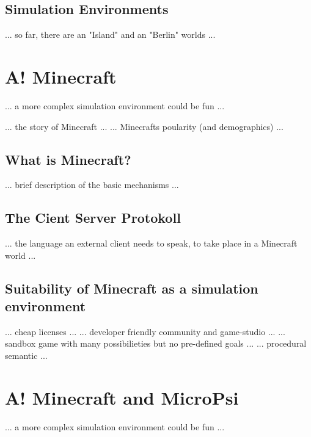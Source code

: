 \subsection{Simulation Environments}
... so far, there are an "Island" and an "Berlin" worlds ...

\section{A! Minecraft}
... a more complex simulation environment could be fun ...

... the story of Minecraft ...
... Minecrafts poularity (and demographics) ...

\subsection{What is Minecraft?}
... brief description of the basic mechanisms ...

\subsection{The Cient Server Protokoll}
... the language an external client needs to speak, to take place in a Minecraft world ...

\subsection{Suitability of Minecraft as a simulation environment}
... cheap licenses ...
... developer friendly community and game-studio ...
... sandbox game with many possibilieties but no pre-defined goals ...
... procedural semantic ...

\section{A! Minecraft and MicroPsi}
... a more complex simulation environment could be fun ...